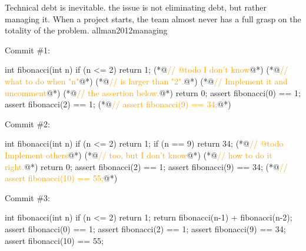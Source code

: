 \documentclass{article}
\begin{document}

  {Technical debt is inevitable. the issue is not eliminating debt, but rather managing it. When a project starts, the team almost never has a full grasp on the totality of the problem.}
  {allman2012managing}

\begin{pptWide}{3}
Commit \#1:\par
{\scriptsize\begin{ffcode}
int fibonacci(int n) {
  if (n <= 2) {
    return 1;
  }
  (*@\textcolor{orange}{// @todo I don't know}@*)
  (*@\textcolor{orange}{// what to do when "n"}@*)
  (*@\textcolor{orange}{// is larger than "2".}@*)
  (*@\textcolor{orange}{// Implement it and uncomment}@*)
  (*@\textcolor{orange}{// the assertion below.}@*)
  return 0;
}
assert fibonacci(0) == 1;
assert fibonacci(2) == 1;
(*@\textcolor{orange}{// assert fibonacci(9) == 34;}@*)
\end{ffcode}
}
\par\columnbreak\par
Commit \#2:\par
{\scriptsize\begin{ffcode}
int fibonacci(int n) {
  if (n <= 2) {
    return 1;
  }
  if (n == 9) {
    return 34;
  }
  (*@\textcolor{orange}{// @todo Implement others}@*)
  (*@\textcolor{orange}{// too, but I don't know}@*)
  (*@\textcolor{orange}{// how to do it right.}@*)
  return 0;
}
assert fibonacci(2) == 1;
assert fibonacci(9) == 34;
(*@\textcolor{orange}{// assert fibonacci(10) == 55;}@*)
\end{ffcode}
}
\par\columnbreak\par
Commit \#3:\par
{\scriptsize\begin{ffcode}
int fibonacci(int n) {
  if (n <= 2) {
    return 1;
  }
  return fibonacci(n-1)
    + fibonacci(n-2);
}
assert fibonacci(0) == 1;
assert fibonacci(2) == 1;
assert fibonacci(9) == 34;
assert fibonacci(10) == 55;
\end{ffcode}
}
\end{pptWide}
\plush{}

\end{document}
